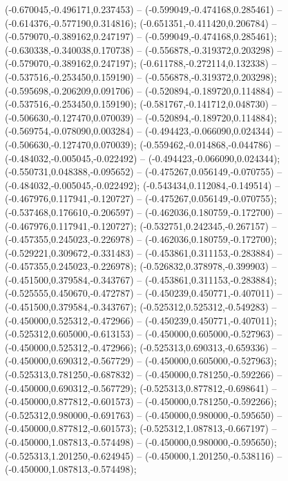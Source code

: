  (-0.670045,-0.496171,0.237453) -- (-0.599049,-0.474168,0.285461) -- (-0.614376,-0.577190,0.314816);
 (-0.651351,-0.411420,0.206784) -- (-0.579070,-0.389162,0.247197) -- (-0.599049,-0.474168,0.285461);
 (-0.630338,-0.340038,0.170738) -- (-0.556878,-0.319372,0.203298) -- (-0.579070,-0.389162,0.247197);
 (-0.611788,-0.272114,0.132338) -- (-0.537516,-0.253450,0.159190) -- (-0.556878,-0.319372,0.203298);
 (-0.595698,-0.206209,0.091706) -- (-0.520894,-0.189720,0.114884) -- (-0.537516,-0.253450,0.159190);
 (-0.581767,-0.141712,0.048730) -- (-0.506630,-0.127470,0.070039) -- (-0.520894,-0.189720,0.114884);
 (-0.569754,-0.078090,0.003284) -- (-0.494423,-0.066090,0.024344) -- (-0.506630,-0.127470,0.070039);
 (-0.559462,-0.014868,-0.044786) -- (-0.484032,-0.005045,-0.022492) -- (-0.494423,-0.066090,0.024344);
 (-0.550731,0.048388,-0.095652) -- (-0.475267,0.056149,-0.070755) -- (-0.484032,-0.005045,-0.022492);
 (-0.543434,0.112084,-0.149514) -- (-0.467976,0.117941,-0.120727) -- (-0.475267,0.056149,-0.070755);
 (-0.537468,0.176610,-0.206597) -- (-0.462036,0.180759,-0.172700) -- (-0.467976,0.117941,-0.120727);
 (-0.532751,0.242345,-0.267157) -- (-0.457355,0.245023,-0.226978) -- (-0.462036,0.180759,-0.172700);
 (-0.529221,0.309672,-0.331483) -- (-0.453861,0.311153,-0.283884) -- (-0.457355,0.245023,-0.226978);
 (-0.526832,0.378978,-0.399903) -- (-0.451500,0.379584,-0.343767) -- (-0.453861,0.311153,-0.283884);
 (-0.525555,0.450670,-0.472787) -- (-0.450239,0.450771,-0.407011) -- (-0.451500,0.379584,-0.343767);
 (-0.525312,0.525312,-0.549283) -- (-0.450000,0.525312,-0.472966) -- (-0.450239,0.450771,-0.407011);
 (-0.525312,0.605000,-0.613153) -- (-0.450000,0.605000,-0.527963) -- (-0.450000,0.525312,-0.472966);
 (-0.525313,0.690313,-0.659336) -- (-0.450000,0.690312,-0.567729) -- (-0.450000,0.605000,-0.527963);
 (-0.525313,0.781250,-0.687832) -- (-0.450000,0.781250,-0.592266) -- (-0.450000,0.690312,-0.567729);
 (-0.525313,0.877812,-0.698641) -- (-0.450000,0.877812,-0.601573) -- (-0.450000,0.781250,-0.592266);
 (-0.525312,0.980000,-0.691763) -- (-0.450000,0.980000,-0.595650) -- (-0.450000,0.877812,-0.601573);
 (-0.525312,1.087813,-0.667197) -- (-0.450000,1.087813,-0.574498) -- (-0.450000,0.980000,-0.595650);
 (-0.525313,1.201250,-0.624945) -- (-0.450000,1.201250,-0.538116) -- (-0.450000,1.087813,-0.574498);
